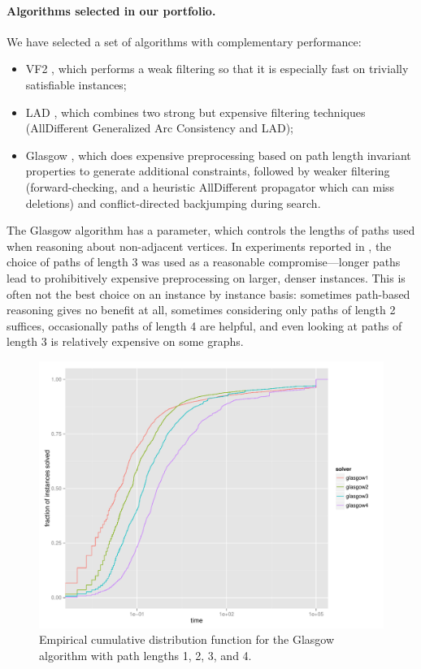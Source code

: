 \documentclass{llncs}
\begin{document}
\paragraph{Algorithms selected in our portfolio.}
We have selected a set of algorithms with complementary performance:
\begin{itemize}
\item VF2 \cite{Cordella:2004}, which performs a weak filtering so that it is especially fast on trivially satisfiable instances;
\item LAD \cite{Solnon:2010}, which combines two strong but expensive filtering techniques (AllDifferent Generalized Arc Consistency and LAD);
\item Glasgow \cite{McCreesh:2015}, which does expensive preprocessing based on path length
    invariant properties to generate additional constraints, followed by weaker filtering
    (forward-checking, and a heuristic AllDifferent propagator which can miss deletions) and
    conflict-directed backjumping during search.
\end{itemize}

\noindent The Glasgow algorithm has a parameter, which controls the lengths of paths used when
reasoning about non-adjacent vertices.  In experiments reported in \cite{McCreesh:2015}, the choice
of paths of length 3 was used as a reasonable compromise---longer paths lead to prohibitively
expensive preprocessing on larger, denser instances. This is often not the best choice on an
instance by instance basis: sometimes path-based reasoning gives no benefit at all, sometimes
considering only paths of length 2 suffices, occasionally paths of length 4 are helpful, and even
looking at paths of length 3 is relatively expensive on some graphs.

\begin{figure}[!ht]
\includegraphics[width=\textwidth]{figures/ecdf-glasgow}
\caption{Empirical cumulative distribution function for the Glasgow algorithm
with path lengths 1, 2, 3, and 4.}
\label{fig:ecdf-glasgow}
\end{figure}
\end{document}
